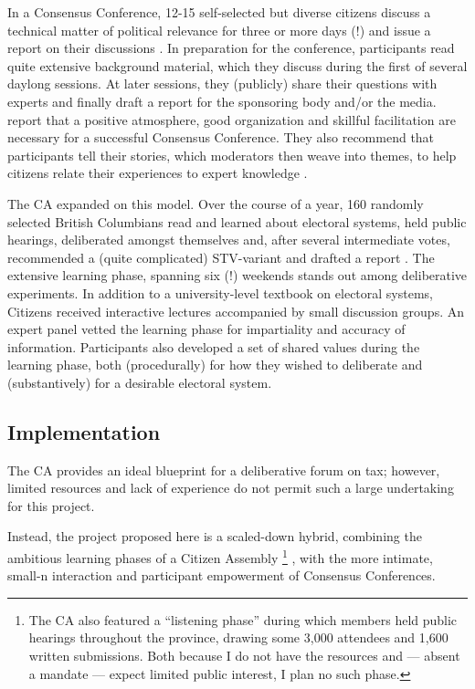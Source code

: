 In a Consensus Conference, 12-15 self-selected but diverse citizens discuss a technical matter of political relevance for three or more days (!) and issue a report on their discussions \citep{LeeKleinman2007}.
In preparation for the conference, participants read quite extensive background material, which they discuss during the first of several daylong sessions. 
At later sessions, they (publicly) share their questions with experts and finally draft a report for the sponsoring body and/or the media.
\citeauthor{LeeKleinman2007} report that a positive atmosphere, good organization and skillful facilitation are necessary for a successful Consensus Conference.
They also recommend that participants tell their stories, which moderators then weave into themes, to help citizens relate their experiences to expert knowledge \citeyearpar[159]{LeeKleinman2007}. 

The \gls{CA} expanded on this model. 
Over the course of a year, 160 randomly selected British Columbians read and learned about electoral systems, held public hearings, deliberated amongst themselves and, after several intermediate votes, recommended a (quite complicated) \gls{STV}-variant and drafted a report \citep{Citizen-2004-aa}.
The extensive learning phase, spanning six (!) weekends stands out among deliberative experiments.
In addition to a university-level textbook on electoral systems, Citizens received interactive lectures accompanied by small discussion groups. 
An expert panel vetted the learning phase for impartiality and accuracy of information.
Participants also developed a set of shared values during the learning phase, both (procedurally) for how they wished to deliberate and (substantively) for a desirable electoral system.

\subsection{Implementation} 

The \gls{CA} provides an ideal blueprint for a deliberative forum on tax; however, limited resources and lack of experience do not permit such a large undertaking for this project.

Instead, the project proposed here is a scaled-down hybrid, combining the ambitious learning phases of a Citizen Assembly
\footnote{
	The \gls{CA} also featured a ``listening phase'' \citep[1609]{Pearse2008} during which members held public hearings throughout the province, drawing some 3,000 attendees and 1,600 written submissions. 
	Both because I do not have the resources and --- absent a mandate --- expect limited public interest, I plan no such phase.
}
, with the more intimate, small-n interaction and participant empowerment of Consensus Conferences.

